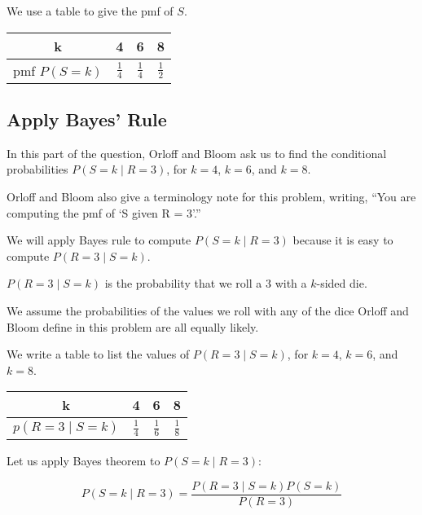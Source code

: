 \documentclass[a4paper,11pt]{article}
\begin{document}
We use a table to give the pmf of $S$.

\begin{center}
  \begin{tabular}{ | c | c | c | c| }
    \hline
    k & 4 & 6 & 8    \\ \hline
    pmf $P\left( S=k \right)$ & $\frac{1}{4}$ & $\frac{1}{4}$ 
      & $\frac{1}{2}$ \\ \hline
  \end{tabular}
\end{center}

\subsection{Apply Bayes' Rule}
In this part of the question, Orloff and Bloom ask us to find the
conditional probabilities $P \left( S = k \mid R = 3\right)$, for
$k=4$, $k=6$, and $k=8$.

Orloff and Bloom also give a terminology note for this problem, 
writing, ``You are computing the pmf of ‘S given R = 3’.''
\cite{probSet2}

We will apply Bayes rule to compute $P \left( S = k \mid R = 3\right)$ 
because it is easy to compute $P \left( R=3 \mid S=k \right)$.

$P \left( R=3 \mid S=k \right)$ is the probability that we roll a $3$ 
with a $k$-sided die.

We assume the probabilities of the values we roll with any of the dice
Orloff and Bloom define in this problem are all equally likely.

We write a table to list the values of $P \left( R=3 \mid S=k \right)$,
for $k=4$, $k=6$, and $k=8$.

\begin{center}
  \begin{tabular}{ | c | c | c | c| }
    \hline
    k & 4 & 6 & 8    \\ \hline
    $p\left( R=3 \mid S=k \right)$ & $\frac{1}{4}$ & $\frac{1}{6}$ 
      & $\frac{1}{8}$ \\ \hline
  \end{tabular}
\end{center}

Let us apply Bayes theorem \cite{reading3} to 
$P \left( S=k \mid R=3 \right)$:

\begin{equation} \label{bayesApplyDice}
P \left( S=k \mid R=3 \right) =
  \frac{ P \left( R=3 \mid S=k \right) P \left( S=k \right)}
    { P \left( R=3 \right)}
\end{equation}
\end{document}
